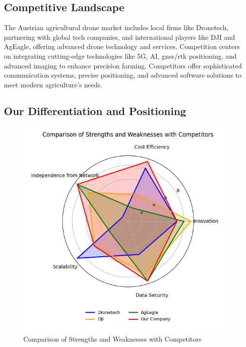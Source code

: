 \subsection{Competitive Landscape}

The Austrian agricultural drone market includes local firms like Dronetech, partnering with global tech companies, and international players like DJI and AgEagle, offering advanced drone technology and services. Competition centers on integrating cutting-edge technologies like 5G, AI, \acrshort{gnss}/\acrshort{rtk} positioning, and advanced imaging to enhance precision farming. Competitors offer sophisticated communication systems, precise positioning, and advanced software solutions to meet modern agriculture's needs.

\subsection{Our Differentiation and Positioning}

\begin{figure}[H] 
	\centering 
	\hspace*{-1.5cm} 
	\includegraphics[width=400pt]{figures/competitors.png} 
	\caption{Comparison of Strengths and Weaknesses with Competitors}
	\label{fig:strengths_weaknesses} 
\end{figure}


